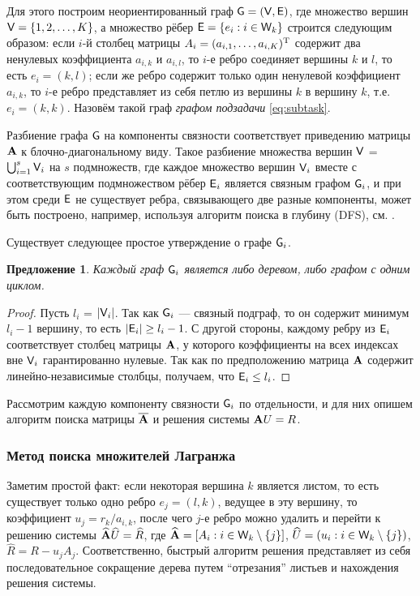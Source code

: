 \documentclass[10pt]{article}
\newtheorem{proposition}{Предложение}
\begin{document}
Для этого построим неориентированный граф $\mathsf{G}=(\mathsf{V}, \mathsf{E})$, где множество вершин $\mathsf{V} = \{1, 2, \ldots, K\}$, а множество рёбер $\mathsf{E} = \{e_i : i \in \mathsf{W}_k \}$ строится следующим образом: если $i$-й столбец матрицы $A_i = (a_{i, 1}, \ldots, a_{i, K})^{\mathrm{T}}$ содержит два ненулевых коэффициента $a_{i,k}$ и $a_{i,l}$, то $i$-е ребро соединяет вершины $k$ и $l$, то есть $e_i = (k, l)$; если же ребро содержит только один ненулевой коэффициент $a_{i,k}$, то $i$-е ребро представляет из себя петлю из вершины $k$ в вершину $k$, т.е. $e_i=(k, k)$. Назовём такой граф \emph{графом подзадачи} \eqref{eq:subtask}.

Разбиение графа $\mathsf{G}$ на компоненты связности соответствует приведению матрицы $\mathbf{A}$ к блочно-диагональному виду. Такое разбиение множества вершин $\mathsf{V}$ = $\bigcup_{i=1}^{s} \mathsf{V}_i$ на $s$ подмножеств, где каждое множество вершин $\mathsf{V}_i$ вместе с соответствующим подмножеством рёбер $\mathsf{E}_i$ является связным графом $\mathsf{G}_i$, и при этом среди $\mathsf{E}$ не существует ребра, связывающего две разные компоненты, может быть построено, например, используя алгоритм поиска в глубину (DFS), см. \cite{cormen2009introduction}.

Существует следующее простое утверждение о графе $\mathsf{G}_i$.
\begin{proposition}
Каждый граф $\mathsf{G}_i$ является либо деревом, либо графом с одним циклом.
\end{proposition}
\begin{proof}
Пусть $l_i$ = $|\mathsf{V}_i|$. Так как $\mathsf{G}_i$ --- связный подграф, то он содержит минимум $l_i - 1$ вершину, то есть $|\mathsf{E}_i| \ge l_i - 1$. С другой стороны, каждому ребру из $\mathsf{E}_i$ соответствует столбец матрицы $\mathbf{A}$, у которого коэффициенты на всех индексах вне $\mathsf{V}_i$ гарантированно нулевые. Так как по предположению матрица $\mathbf{A}$ содержит линейно-независимые столбцы, получаем, что $\mathsf{E}_i \le l_i$.
\end{proof}

Рассмотрим каждую компоненту связности $\mathsf{G}_i$ по отдельности, и для них опишем алгоритм поиска матрицы $\overline {\mathbf{A}}$ и решения системы $\mathbf{A} U = R$.
\subsubsection{Метод поиска множителей Лагранжа}
Заметим простой факт: если некоторая вершина $k$ является листом, то есть существует только одно ребро $e_j = (l, k)$, ведущее в эту вершину, то коэффициент $u_j = r_k / a_{i, k}$, после чего $j$-е ребро можно удалить и перейти к решению системы $\widehat {\mathbf{A}} \widehat U = \widehat R$, где $\widehat {\mathbf{A}} = [A_i : i \in \mathsf{W}_k \setminus \{j \}]$, $\widehat U = (u_i : i \in \mathsf{W}_k \setminus \{j \})$, $\widehat R = R - u_j A_j$. Соответственно, быстрый алгоритм решения представляет из себя последовательное сокращение дерева путем ``отрезания'' листьев и нахождения решения системы.
\end{document}
